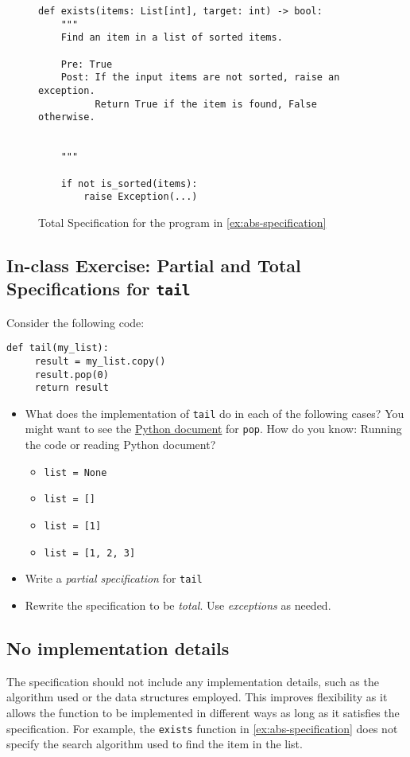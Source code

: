 \documentclass[oneside,11pt,dvipsnames]{book}
\newcommand{\code}[1]{\texttt{#1}}
\begin{document}
\begin{figure}
\begin{lstlisting}
def exists(items: List[int], target: int) -> bool:
    """
    Find an item in a list of sorted items.

    Pre: True
    Post: If the input items are not sorted, raise an exception.
          Return True if the item is found, False otherwise.


    """

    if not is_sorted(items):
        raise Exception(...)
\end{lstlisting}
\caption{Total Specification for the program in \autoref{ex:abs-specification}}\label{ex:abs-total}
\end{figure}


\subsection{In-class Exercise: Partial and Total Specifications for \code{tail}}

Consider the following code:

\begin{lstlisting}
def tail(my_list):
     result = my_list.copy()
     result.pop(0)
     return result
\end{lstlisting}

\begin{itemize}
     \item What does the implementation of \code{tail} do in each of the following cases? You might want to see the \href{https://docs.python.org/3/tutorial/datastructures.html}{Python document} for \code{pop}.  How do you know: Running the code or reading Python document?
     \begin{itemize}
         \item \code{list = None}
         \item \code{list = []}
         \item \code{list = [1]}  
         \item \code{list = [1, 2, 3]}
     \end{itemize}
     \item Write a \emph{partial specification} for \code{tail}
     \item Rewrite the specification to be \emph{total}. Use \emph{exceptions} as needed.
    \end{itemize}

\subsection{No implementation details}
The specification should not include any implementation details, such as the algorithm used or the data structures employed. This improves flexibility as it allows the function to be implemented in different ways as long as it satisfies the specification. For example, the \code{exists} function in \autoref{ex:abs-specification} does not specify the search algorithm used to find the item in the list.
\end{document}

